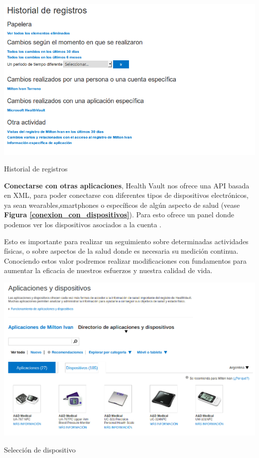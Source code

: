 \begin{itemize}
{    \begin{correccionFigure}[h]
      \centering
      \includegraphics[width=.8\textwidth]{img/tp1/3-lista_de_cambios}
      \caption{Historial de registros}
      \label{lista_de_cambios}
    \end{correccionFigure} 
  
\item \textbf{Conectarse con otras aplicaciones}, Health Vault nos ofrece una API basada en XML, para poder conectarse con diferentes tipos de dispositivos electrónicos, ya sean wearables,smartphones o específicos de algún aspecto de salud (vease \textbf{Figura \ref{conexion_con_dispositivos}}). Para esto ofrece un panel donde podemos ver los dispositivos asociados a la cuenta . 

Esto es importante para realizar un seguimiento sobre determinadas actividades físicas, o sobre aspectos de la salud donde es necesaria su medición continua. Conociendo estos valor podremos realizar modificaciones con fundamentos para aumentar la eficacia de nuestros esfuerzos y nuestra calidad de vida.

    \begin{correccionFigure}[h]
      \centering
      \includegraphics[width=.8\textwidth]{img/tp1/3-conexion_con_dispositivo}
      \caption{Selección de dispositivo}
      \label{conexion_con_dispositivos}
    \end{correccionFigure} 

}
\end{itemize}
